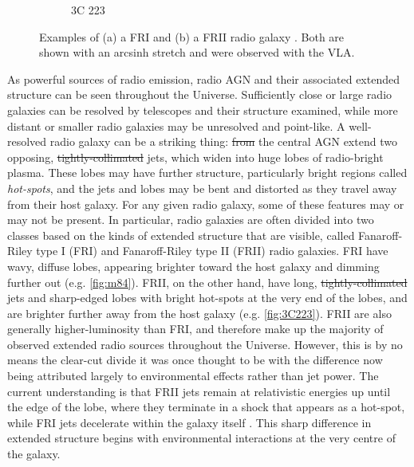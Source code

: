 \documentclass[11pt, a4paper]{book}
\newcommand{\defn}[1]{\emph{#1}}
\providecommand{\DIFaddtex}[1]{{\protect\color{blue}\uwave{#1}}} %
\providecommand{\DIFdeltex}[1]{{\protect\color{red}\sout{#1}}}                      %
\providecommand{\DIFaddbegin}{} %
\providecommand{\DIFaddend}{} %
\providecommand{\DIFdelbegin}{} %
\providecommand{\DIFdelend}{} %
\providecommand{\DIFadd}[1]{\texorpdfstring{\DIFaddtex{#1}}{#1}} %
\providecommand{\DIFdel}[1]{\texorpdfstring{\DIFdeltex{#1}}{}} %
\newcommand{\DIFscaledelfig}{0.5}
\newlength{\DIFdelgraphicswidth} %
\newlength{\DIFdelgraphicsheight} %
\newcommand{\DIFaddincludegraphics}[2][]{{\color{blue}\fbox{\DIFOincludegraphics[#1]{#2}}}} %
\newcommand{\DIFdelincludegraphics}[2][]{%
\sbox{\DIFdelgraphicsbox}{\DIFOincludegraphics[#1]{#2}}%
\settoboxwidth{\DIFdelgraphicswidth}{\DIFdelgraphicsbox} %
\settoboxtotalheight{\DIFdelgraphicsheight}{\DIFdelgraphicsbox} %
\scalebox{\DIFscaledelfig}{%
\parbox[b]{\DIFdelgraphicswidth}{\usebox{\DIFdelgraphicsbox}\\[-\baselineskip] \rule{\DIFdelgraphicswidth}{0em}}\llap{\resizebox{\DIFdelgraphicswidth}{\DIFdelgraphicsheight}{%
\setlength{\unitlength}{\DIFdelgraphicswidth}%
\begin{picture}(1,1)%
\thicklines\linethickness{2pt} %
{\color[rgb]{1,0,0}\put(0,0){\framebox(1,1){}}}%
{\color[rgb]{1,0,0}\put(0,0){\line( 1,1){1}}}%
{\color[rgb]{1,0,0}\put(0,1){\line(1,-1){1}}}%
\end{picture}%
}\hspace*{3pt}}} %
} %
\DeclareRobustCommand{\DIFaddbegin}{\DIFOaddbegin \let\includegraphics\DIFaddincludegraphics} %
\DeclareRobustCommand{\DIFaddend}{\DIFOaddend \let\includegraphics\DIFOincludegraphics} %
\DeclareRobustCommand{\DIFdelbegin}{\DIFOdelbegin \let\includegraphics\DIFdelincludegraphics} %
\DeclareRobustCommand{\DIFdelend}{\DIFOaddend \let\includegraphics\DIFOincludegraphics} %
\begin{document}
\begin{figure}
\begin{subfigure}{0.45\textwidth}
                \caption{3C 223}
                \label{fig:3C223}
            \end{subfigure}
            \caption[Examples of a FRI and a FRII radio galaxy.]{\label{fig:fri-frii} Examples of (a) a FRI \citep{laing_rotation_1987} and (b) a FRII radio galaxy \citep{leahy_vla_1991}. Both are shown with an arcsinh stretch and were observed with the VLA.}
        \end{figure}

        As powerful sources of radio emission, radio AGN and their associated extended structure can be seen throughout the Universe. Sufficiently close or large radio galaxies can be resolved by telescopes and their structure examined, while more distant or smaller radio galaxies may be unresolved and point-like. A well-resolved radio galaxy can be a striking thing: \DIFdelbegin \DIFdel{from }\DIFdelend \DIFaddbegin \DIFadd{From }\DIFaddend the central AGN extend two opposing, \DIFdelbegin \DIFdel{tightly-collimated }\DIFdelend \DIFaddbegin \DIFadd{tightly collimated }\DIFaddend jets, which widen into huge lobes of radio-bright plasma. These lobes may have further structure, particularly bright regions called \defn{hot-spots}, and the jets and lobes may be bent and distorted as they travel away from their host galaxy. For any given radio galaxy, some of these features may or may not be present. In particular, radio galaxies are often divided into two classes based on the kinds of extended structure that are visible, called Fanaroff-Riley type I (FRI) and Fanaroff-Riley type II (FRII) radio galaxies. FRI have wavy, diffuse lobes, appearing brighter toward the host galaxy and dimming further out (e.g. \autoref{fig:m84}). FRII, on the other hand, have long, \DIFdelbegin \DIFdel{tightly-collimated }\DIFdelend \DIFaddbegin \DIFadd{tightly collimated }\DIFaddend jets and sharp-edged lobes with bright hot-spots \citep{urry95unified} at the very end of the lobes, and are brighter further away from the host galaxy (e.g. \autoref{fig:3C223}). FRII are also generally higher-luminosity \citep{fanaroff1974} than FRI, and therefore make up the majority of observed extended radio sources throughout the Universe. However, this is by no means the clear-cut divide it was once thought to be \citep{mingo_revisiting_2019} with the difference now being attributed largely to environmental effects rather than jet power. The current understanding is that FRII jets remain at relativistic energies up until the edge of the lobe, where they terminate in a shock that appears as a hot-spot, while FRI jets decelerate within the galaxy itself \citep{hardcastle20feedback}. This sharp difference in extended structure begins with environmental interactions at the very centre of the galaxy.
\end{document}

